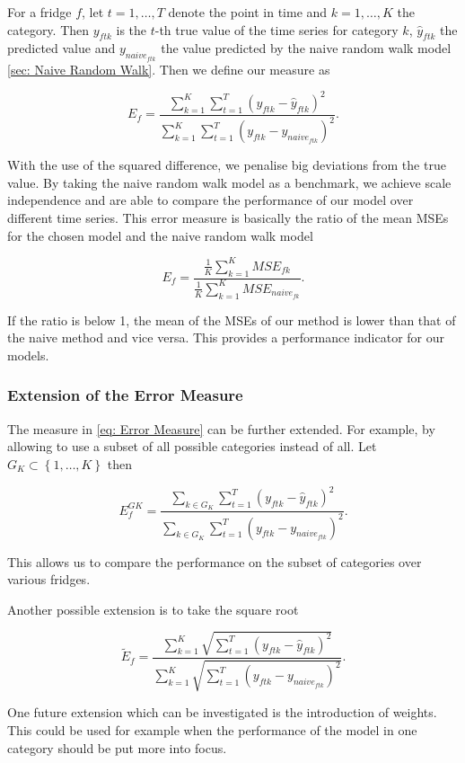 For a fridge $f$, let $t = 1,\ldots,T$ denote the point in time and $k=1,\ldots,K$ the category. Then $y_{ftk}$ is the $t$-th true value of the time series for category $k$, $\hat{y}_{ftk}$ the predicted value and $y_{naive_{ftk}}$ the value predicted by the naive random walk model \ref{sec: Naive Random Walk}. Then we define our measure as

\begin{equation}
E_f=\frac{\sum_{k=1}^{K}\sum_{t=1}^T(y_{ftk}-\hat{y}_{ftk})^2}{\sum_{k=1}^{K}\sum_{t=1}^T(y_{ftk}-y_{naive_{ftk}})^2}.
\label{eq: Error Measure}
\end{equation}

With the use of the squared difference, we penalise big deviations from the true value. By taking the naive random walk model as a benchmark, we achieve scale independence and are able to compare the performance of our model over different time series. This error measure is basically the ratio of the mean MSEs for the chosen model and the naive random walk model

\begin{equation}
E_f=\frac{\frac{1}{K}\sum_{k=1}^K MSE_{fk}}{\frac{1}{K}\sum_{k=1}^K MSE_{naive_{fk}}}.
\label{eq: Error Measure MSE}
\end{equation}

If the ratio is below 1, the mean of the MSEs of our method is lower than that of the naive method and vice versa. This provides a performance indicator for our models. 

\subsubsection{Extension of the Error Measure}
\label{sec:Error Measure Extension}

The measure in \ref{eq: Error Measure} can be further extended. For example, by allowing to use a subset of all possible categories instead of all. Let $G_K \subset \left\{1,\ldots,K\right\}$ then

\begin{equation}
E^{GK}_{f}=\frac{\sum_{k \in G_K}\sum_{t=1}^T(y_{ftk}-\hat{y}_{ftk})^2}{\sum_{k \in G_K}\sum_{t=1}^T(y_{ftk}-y_{naive_{ftk}})^2}.
\label{eq: Error Measure Subsets}
\end{equation}

This allows us to compare the performance on the subset of categories over various fridges. 

Another possible extension is to take the square root

\begin{equation}
\widetilde{E}_f=\frac{\sum_{k=1}^{K}\sqrt{\sum_{t=1}^T(y_{ftk}-\hat{y}_{ftk})^2}}{\sum_{k=1}^{K}\sqrt{\sum_{t=1}^T(y_{ftk}-y_{naive_{ftk}})^2}}.
\label{eq: Error Measure Sqrt} 
\end{equation}

One future extension which can be investigated is the introduction of weights. This could be used for example when the performance of the model in one category should be put more into focus. 